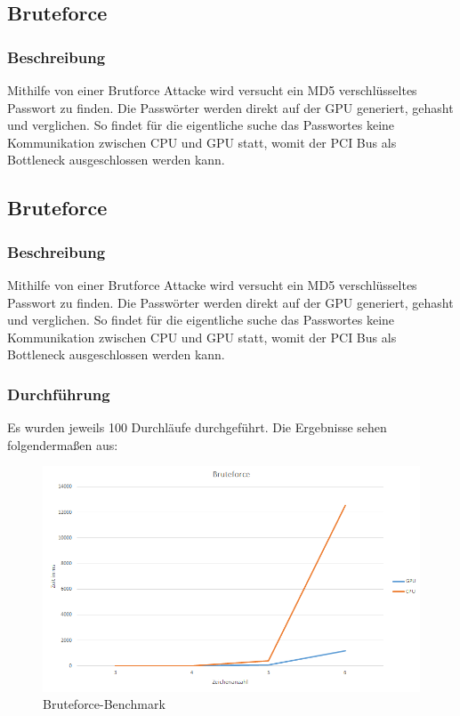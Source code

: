 \subsection{Bruteforce}
\subsubsection{Beschreibung}
Mithilfe von einer Brutforce Attacke wird versucht ein MD5 verschlüsseltes Passwort zu finden. Die Passwörter werden direkt auf der GPU generiert, gehasht und verglichen. So findet für die eigentliche suche das Passwortes keine Kommunikation zwischen CPU und GPU statt, womit der PCI Bus als Bottleneck ausgeschlossen werden kann.

\subsection{Bruteforce}
\subsubsection{Beschreibung}
Mithilfe von einer Brutforce Attacke wird versucht ein MD5 verschlüsseltes Passwort zu finden. Die Passwörter werden direkt auf der GPU generiert, gehasht und verglichen. So findet für die eigentliche suche das Passwortes keine Kommunikation zwischen CPU und GPU statt, womit der PCI Bus als Bottleneck ausgeschlossen werden kann.
\subsubsection{Durchführung}
Es wurden jeweils 100 Durchläufe durchgeführt.
Die Ergebnisse sehen folgendermaßen aus:
\begin{figure}[!h]
	\begin{center}
		\includegraphics[width=17cm]{images/bruteforce.png}
		\caption{Bruteforce-Benchmark}
	\end{center}
\end{figure}
\newpage
